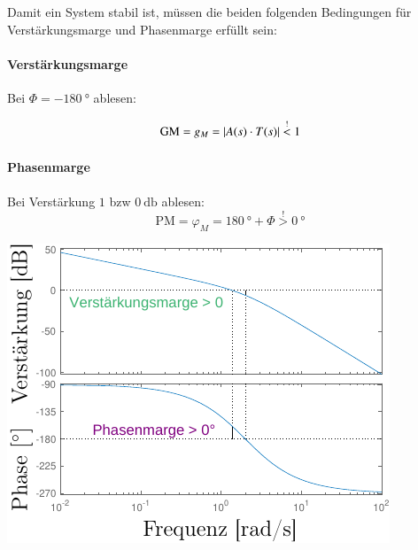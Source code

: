 \smallskip
Damit ein System stabil ist, müssen die beiden folgenden Bedingungen für Verstärkungsmarge und Phasenmarge erfüllt sein:


\begin{minipage}[t]{0.48\columnwidth}
    \paragraph{Verstärkungsmarge}

    Bei $\Phi = \qty{-180}{\degree}$ ablesen:

    \[
        \text{GM} = g_M = \left|A(s) \cdot T(s)\right| \overset{!}{<} 1
    \]

    \smallskip

    \paragraph{Phasenmarge}

    Bei Verstärkung $1$ bzw  $\qty{0}{\decibel}$ ablesen:
    \[
        \text{PM} = \varphi_M = \qty{180}{\degree} + \Phi \overset{!}{>} \qty{0}{\degree}
    \]
\end{minipage}
\hfill
\begin{minipage}[t]{0.48\columnwidth}
    \includegraphics[width=\columnwidth, align=t]{images/10_bode_plot_V2.pdf}
\end{minipage}




